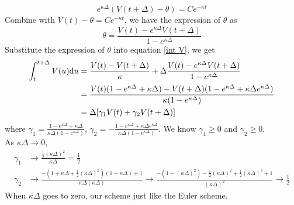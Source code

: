 \documentclass{ws-ijfe}
\begin{document}
\begin{equation*}
  e^{\kappa\Delta}(V(t+\Delta)-\theta)=Ce^{-\kappa  t}
\end{equation*}
Combine with $V(t)-\theta= Ce^{-\kappa t}$, we have the expression of $\theta$ as
\begin{equation*}
\theta=\frac{V(t)-e^{\kappa\Delta}V(t+\Delta)}{1-e^{\kappa\Delta}}
\end{equation*}
Substitute the expression of $\theta$ into equation \eqref{int V}, we get
\begin{equation*}
  \begin{split}
    \int_{t}^{t+\Delta}V(u)\mathrm{d} u &= \frac{V(t)-V(t+\Delta)}{\kappa}+\Delta\frac{V(t)-e^{\kappa\Delta}V(t+\Delta)}{1-e^{\kappa\Delta}}  \\
    &=\frac{V(t)(1-e^{\kappa\Delta}+\kappa\Delta)-V(t+\Delta)(1-e^{\kappa\Delta}+\kappa\Delta e^{\kappa\Delta})}{\kappa(1-e^{\kappa\Delta})} \\
     &=\Delta[\gamma_1 V(t)+\gamma_2 V(t+\Delta)]
  \end{split}
\end{equation*}
where
$\gamma_1 = \frac{1-e^{\kappa\Delta}+\kappa\Delta}{\kappa\Delta(1-e^{\kappa\Delta})}$,
$\gamma_2 = -\frac{1-e^{\kappa\Delta}+\kappa\Delta e^{\kappa\Delta}}{\kappa\Delta(1-e^{\kappa\Delta})}$.
We know $\gamma_1\geq 0$ and $\gamma_2\geq 0$.\\
As $\kappa\Delta\rightarrow 0$, \begin{align*}
 \gamma_1 &\rightarrow\frac{\frac{1}{2}(\kappa\Delta)^2}{\kappa\Delta}=\frac{1}{2} \\
  \gamma_2 &\rightarrow\frac{-(1+\kappa\Delta+\frac{1}{2}(\kappa\Delta)^2)(1-\kappa\Delta)+1}{\kappa\Delta(\kappa\Delta)}
  \rightarrow\frac{-(1-(\kappa\Delta)^2)-\frac{1}{2}(\kappa\Delta)^2+\frac{1}{2}(\kappa\Delta)^3+1}{(\kappa\Delta)^2}\rightarrow\frac{1}{2}
\end{align*}
When $\kappa\Delta$ goes to zero, our scheme just like the Euler scheme.
\end{document}
